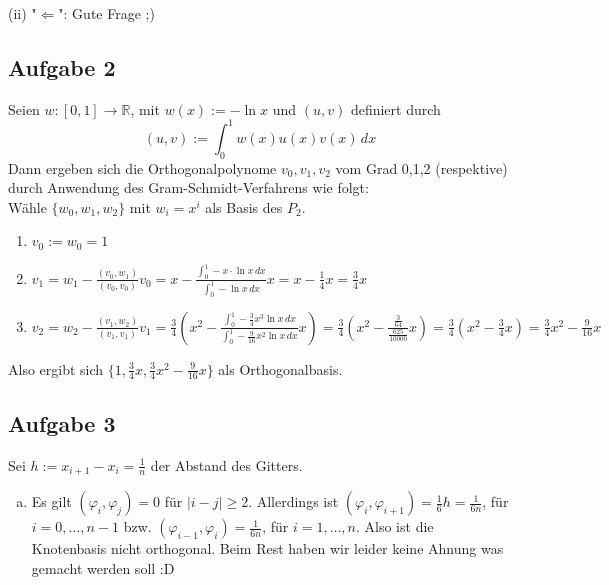 \documentclass[11pt,a4paper,ngerman]{article}
\begin{document}
(ii) "$\Leftarrow$": Gute Frage ;)\\

\subsection*{Aufgabe 2}
Seien $w: [0,1] \to \mathbb{R}$, mit $w(x) := - \ln x$ und $(u,v)$ definiert durch
$$ (u,v) := \int_0^1 w(x)u(x)v(x) \, dx $$
Dann ergeben sich die Orthogonalpolynome $v_0,v_1,v_2$ vom Grad 0,1,2 (respektive) durch Anwendung
des Gram-Schmidt-Verfahrens wie folgt: \\

Wähle $\{w_0, w_1, w_2\}$ mit $w_i = x^i$ als Basis des $P_2$.
\begin{enumerate}
\item $v_0 := w_0 = 1$ 
\item $v_1 = w_1 - \frac{(v_0,w_1)}{(v_0,v_0)} v_0 = x - \frac{\int_0^1 - x \cdot \ln x \, dx}{\int_0^1 - \ln x \, dx} x
           = x - \frac{1}{4} x = \frac{3}{4}x$
\item $v_2 = w_2 - \frac{(v_1,w_2)}{(v_1,v_1)} v_1
           = \frac{3}{4} \left( x^2 - \frac{\int_0^1 - \frac{3}{4}x^3 \ln x \, dx }{ \int_0^1 - \frac{9}{16}x^2\ln x \, dx} x \right)
           = \frac{3}{4} \left(x^2 - \frac{\frac{3}{64}}{\frac{625}{10000}} x\right)
           = \frac{3}{4} \left(x^2 - \frac{3}{4} x\right) = \frac{3}{4}x^2 - \frac{9}{16}x$
\end{enumerate}

Also ergibt sich $\{1,\frac{3}{4}x,\frac{3}{4}x^2 - \frac{9}{16}x \}$ als Orthogonalbasis.
\subsection*{Aufgabe 3}
Sei $h := x_{i+1} - x_i = \frac{1}{n}$ der Abstand des Gitters.
\begin{enumerate}[a)]
\item Es gilt $(\varphi_i,\varphi_j) = 0$ für $|i - j| \geq 2$. Allerdings ist $(\varphi_i,\varphi_{i+1}) = \frac{1}{6}h = \frac{1}{6n}$, für $i = 0,\ldots,n-1$ bzw. $(\varphi_{i-1},\varphi_i) = \frac{1}{6n}$, für $i = 1,\ldots,n$. Also ist die Knotenbasis nicht orthogonal.
Beim Rest haben wir leider keine Ahnung was gemacht werden soll :D
\end{enumerate}


\label{LastPage}
\end{document}
